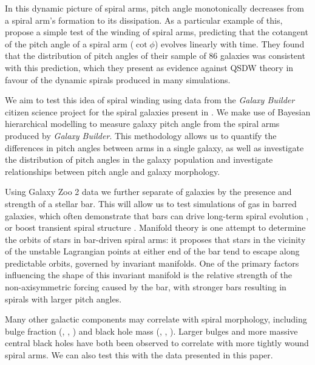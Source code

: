 In this dynamic picture of spiral arms, pitch angle monotonically decreases from a spiral arm's formation to its dissipation. As a particular example of this, \citet{2019arXiv190910291P} propose a simple test of the winding of spiral arms, predicting that the cotangent of the pitch angle of a spiral arm ($\cot \phi$) evolves linearly with time. They found that the distribution of pitch angles of their sample of 86 galaxies was consistent with this prediction, which they present as evidence against QSDW theory in favour of the dynamic spirals produced in many simulations.

We aim to test this idea of spiral winding using data from the \textit{Galaxy Builder} citizen science project for the spiral galaxies present in \citet{2020arXiv200610450L}. We make use of Bayesian hierarchical modelling to measure galaxy pitch angle from the spiral arms produced by \textit{Galaxy Builder}. This methodology allows us to quantify the differences in pitch angles between arms in a single galaxy, as well as investigate the distribution of pitch angles in the galaxy population and investigate relationships between pitch angle and galaxy morphology.

Using Galaxy Zoo 2 data \citep{Willett2013:1308.3496v2} we further separate of galaxies by the presence and strength of a stellar bar. This will allow us to test simulations of gas in barred galaxies, which often demonstrate that bars can drive long-term spiral evolution \citep{2008A&A...489..115R}, or boost transient spiral structure \citep{2012MNRAS.426..167G}. Manifold theory \citep{2006A&A...453...39R,2009MNRAS.394...67A,2009MNRAS.400.1706A} is one attempt to determine the orbits of stars in bar-driven spiral arms: it proposes that stars in the vicinity of the unstable Lagrangian points at either end of the bar tend to escape along predictable orbits, governed by invariant manifolds. One of the primary factors influencing the shape of this invariant manifold is the relative strength of the non-axisymmetric forcing caused by the bar, with stronger bars resulting in spirals with larger pitch angles.

Many other galactic components may correlate with spiral morphology, including bulge fraction (\citealt{1975A&A....44..363Y}, \citealt{2013MNRAS.436.1074S}, \citealt{2019MNRAS.487.1808M}) and black hole mass (\citealt{2008ApJ...678L..93S}, \citealt{2017MNRAS.471.2187D}, \citealt{2019MS&E..571a2118A}). Larger bulges and more massive central black holes have both been observed to correlate with more tightly wound spiral arms. We can also test this with the data presented in this paper.


